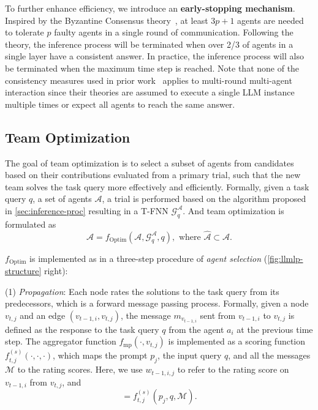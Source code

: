 \documentclass{article} %
\begin{document}
To further enhance efficiency, we introduce an \textbf{early-stopping mechanism}. Inspired by the Byzantine Consensus theory~\citep{pbft}, at least $3p+1$ agents are needed to tolerate $p$ faulty agents in a single round of communication. 
Following the theory, the inference process will be terminated when over 2/3 of agents in a single layer have a consistent answer. In practice, the inference process will also be terminated when the maximum time step is reached.
Note that none of the consistency measures used in prior work~\citep{wang2023selfconsistency, aggarwal2023adaptive-consistency, exchange-of-thought} applies to multi-round multi-agent interaction since their theories are assumed to execute a single LLM instance multiple times or expect all agents to reach the same answer.

\subsection{Team Optimization}\label{sec:role-optimize}
The goal of team optimization is to select a subset of agents from candidates based on their contributions evaluated from a primary trial, such that the new team solves the task query more effectively and efficiently.
Formally, given a task query $q$, a set of agents $\mathcal{A}$, a trial is performed based on the algorithm proposed in \cref{sec:inference-proc} resulting in a T-FNN $\mathcal{G}_q^\mathcal{A}$.
And team optimization is formulated as
\begin{equation}
   \hat{\mathcal{A}}=f_{\mathrm{Optim}}(\mathcal{A}, \mathcal{G}_q^\mathcal{A}, q), \text{ where }\hat{\mathcal{A}}\subset\mathcal{A}.
\end{equation}

$f_{\mathrm{Optim}}$ is implemented as in a three-step procedure of \textit{agent selection} (\cref{fig:llmlp-structure} right): 

(1) \textit{Propagation}: Each node rates the solutions to the task query from its predecessors, which is a forward message passing process. Formally, given a node $v_{t,j}$ and an edge $(v_{t-1, i}, v_{t,j})$, the message $m_{v_{t-1,i}}$ sent from $v_{t-1, i}$ to $v_{t,j}$ is defined as the response to the task query $q$ from the agent $a_i$ at the previous time step. The aggregator function $f_{\mathrm{mp}}(\cdot, v_{t,j})$ is implemented as a scoring function $f^{(s)}_{t,j}(\cdot, \cdot, \cdot)$, which maps the prompt $p_j$, the input query $q$, and all the messages $\mathcal{M}$ to the rating scores. Here, we use $w_{t-1,i,j}$ to refer to the rating score on $v_{t-1,i}$ from $v_{t,j}$, and 
\begin{equation}
    [w_{t-1,1,j}, w_{t-1,2,j}, ..., w_{t-1,N,j}] = f^{(s)}_{t,j}\left(p_j, q, \mathcal{M}\right).
\end{equation}
\end{document}
